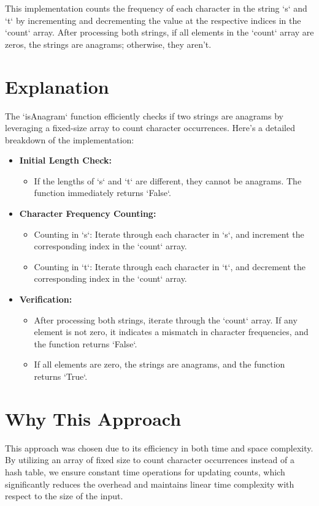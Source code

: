 This implementation counts the frequency of each character in the string `s` and `t` by incrementing and decrementing the value at the respective indices in the `count` array. After processing both strings, if all elements in the `count` array are zeros, the strings are anagrams; otherwise, they aren't.

\section*{Explanation}
The `isAnagram` function efficiently checks if two strings are anagrams by leveraging a fixed-size array to count character occurrences. Here's a detailed breakdown of the implementation:

\begin{itemize}
    \item \textbf{Initial Length Check:}
    \begin{itemize}
        \item If the lengths of `s` and `t` are different, they cannot be anagrams. The function immediately returns `False`.
    \end{itemize}
    
    \item \textbf{Character Frequency Counting:}
    \begin{itemize}
        \item Counting in `s`: Iterate through each character in `s`, and increment the corresponding index in the `count` array.
        \item Counting in `t`: Iterate through each character in `t`, and decrement the corresponding index in the `count` array.
    \end{itemize}
    
    \item \textbf{Verification:}
    \begin{itemize}
        \item After processing both strings, iterate through the `count` array. If any element is not zero, it indicates a mismatch in character frequencies, and the function returns `False`.
        \item If all elements are zero, the strings are anagrams, and the function returns `True`.
    \end{itemize}
\end{itemize}

\section*{Why This Approach}
This approach was chosen due to its efficiency in both time and space complexity. By utilizing an array of fixed size to count character occurrences instead of a hash table, we ensure constant time operations for updating counts, which significantly reduces the overhead and maintains linear time complexity with respect to the size of the input.

